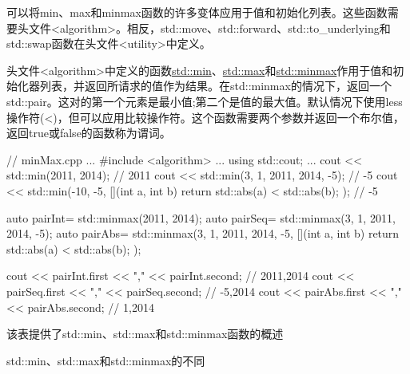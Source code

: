 可以将min、max和minmax函数的许多变体应用于值和初始化列表。这些函数需要头文件<algorithm>。相反，std::move、std::forward、std::to\_underlying和std::swap函数在头文件<utility>中定义。


头文件<algorithm>中定义的函数\href{http://en.cppreference.com/w/cpp/algorithm/min}{std::min}、\href{http://en.cppreference.com/w/cpp/algorithm/max}{std::max}和\href{http://en.cppreference.com/w/cpp/algorithm/minmax}{std::minmax}作用于值和初始化器列表，并返回所请求的值作为结果。在std::minmax的情况下，返回一个std::pair。这对的第一个元素是最小值;第二个是值的最大值。默认情况下使用less操作符(<)，但可以应用比较操作符。这个函数需要两个参数并返回一个布尔值，返回true或false的函数称为谓词。


\begin{cpp}
// minMax.cpp
...
#include <algorithm>
...
using std::cout;
...
cout << std::min(2011, 2014); // 2011
cout << std::min({3, 1, 2011, 2014, -5}); // -5
cout << std::min(-10, -5, [](int a, int b)
                { return std::abs(a) < std::abs(b); }); // -5

auto pairInt= std::minmax(2011, 2014);
auto pairSeq= std::minmax({3, 1, 2011, 2014, -5});
auto pairAbs= std::minmax({3, 1, 2011, 2014, -5}, [](int a, int b)
                      { return std::abs(a) < std::abs(b); });

cout << pairInt.first << "," << pairInt.second; // 2011,2014
cout << pairSeq.first << "," << pairSeq.second; // -5,2014
cout << pairAbs.first << "," << pairAbs.second; // 1,2014
\end{cpp}

该表提供了std::min、std::max和std::minmax函数的概述

\begin{center}
std::min、std::max和std::minmax的不同
\end{center}

